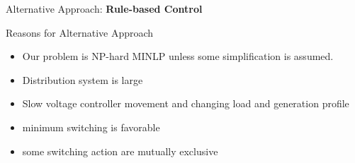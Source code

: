 \documentclass[10pt]{beamer}
\begin{document}
\begin{frame}
\begin{center}
\huge Alternative Approach: \textbf{Rule-based Control}
\end{center}
\end{frame}

\begin{frame}{Reasons for Alternative Approach}
\begin{itemize}
\item Our problem is NP-hard MINLP unless some simplification is assumed.
\item Distribution system is large
\item Slow voltage controller movement and changing load and generation profile
\item minimum switching is favorable
\item some switching action are mutually exclusive
\end{itemize}
\end{frame}
\end{document}
